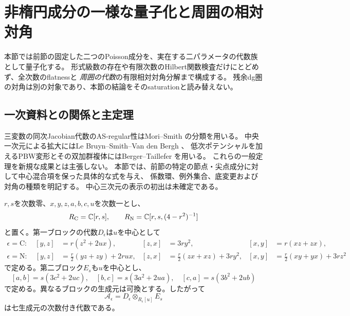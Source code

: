 \section{非楕円成分の一様な量子化と周囲の相対対角}
\label{nq:sec:quantization}
本節では前節の固定した二つのPoisson成分を、実在する二パラメータの代数族として量子化する。
形式級数の存在や有限次数のHilbert関数検査だけにとどめず、全次数のflatnessと
\emph{周囲の代数}の有限相対対角分解まで構成する。
残余dg圏の対角は別の対象であり、本節の結論をそのsaturationと読み替えない。

\subsection{一次資料との関係と主定理}
三変数の同次Jacobian代数のAS-regular性はMori--Smith
\cite[Theorem 4.2, Lemma 4.1]{MSNE12}の分類を用いる。
中央一次元による拡大にはLe Bruyn--Smith--Van den Bergh
\cite[Theorem 2.6, Corollary 2.7, Theorem 3.1.3]{LBSVNE12}、
低次ポテンシャルを加えるPBW変形とその双加群複体にはBerger--Taillefer
\cite[Theorems 3.1 and 3.6]{BTNE12}を用いる。
これらの一般定理を新規な成果とは主張しない。
本節では、前節の特定の節点・尖点成分に対して中心混合項を保った具体的な式を与え、
係数環、例外集合、底変更および対角の種類を明記する。
中心三次元の表示の初出は未確定である。

$r,s$を次数零、$x,y,z,a,b,c,u$を次数一とし、
\[
 R_{\mathrm C}=\mathbb C[r,s],\qquad
 R_{\mathrm N}=\mathbb C[r,s,(4-r^2)^{-1}]
\]
と置く。第一ブロックの代数$D_\epsilon$は$u$を中心として
\begin{align}
 \epsilon=\mathrm C:\quad
 [y,z]&=r(z^2+2ux),&[z,x]&=3ry^2,&[x,y]&=r(xz+zx),
 \label{nq:eq:cusp}\\
 \epsilon=\mathrm N:\quad
 [y,z]&=\tfrac r2(yz+zy)+2rux,&
 [z,x]&=\tfrac r2(zx+xz)+3ry^2,&
 [x,y]&=\tfrac r2(xy+yx)+3rz^2
 \label{nq:eq:node}
\end{align}
で定める。第二ブロック$E_s$も$u$を中心とし、
\begin{equation}\label{nq:eq:fermat}
 [a,b]=s(3c^2+2uc),\quad
 [b,c]=s(3a^2+2ua),\quad
 [c,a]=s(3b^2+2ub)
\end{equation}
で定める。異なるブロックの生成元は可換とする。したがって
\[
 \mathcal A_\epsilon=D_\epsilon\otimes_{R_\epsilon[u]}E_s
\]
は七生成元の次数付き代数である。

